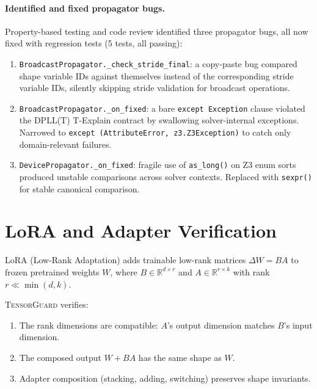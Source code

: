 \documentclass[11pt]{article}
\begin{document}
\paragraph{Identified and fixed propagator bugs.}
Property-based testing and code review identified three propagator bugs,
all now fixed with regression tests (5 tests, all passing):
\begin{enumerate}[leftmargin=2em]
  \item \texttt{BroadcastPropagator.\_check\_stride\_final}: a copy-paste
    bug compared shape variable IDs against themselves instead of
    the corresponding stride variable IDs, silently skipping stride
    validation for broadcast operations.
  \item \texttt{BroadcastPropagator.\_on\_fixed}: a bare
    \texttt{except Exception} clause violated the DPLL(T)
    T-Explain contract by swallowing solver-internal exceptions.
    Narrowed to \texttt{except (AttributeError, z3.Z3Exception)}
    to catch only domain-relevant failures.
  \item \texttt{DevicePropagator.\_on\_fixed}: fragile use of
    \texttt{as\_long()} on Z3 enum sorts produced unstable
    comparisons across solver contexts.  Replaced with
    \texttt{sexpr()} for stable canonical comparison.
\end{enumerate}


\section{LoRA and Adapter Verification}\label{app:lora}

LoRA (Low-Rank Adaptation) adds trainable low-rank matrices
$\Delta W = BA$ to frozen pretrained weights $W$, where
$B \in \mathbb{R}^{d \times r}$ and $A \in \mathbb{R}^{r \times k}$
with rank $r \ll \min(d, k)$.

\textsc{TensorGuard} verifies:
\begin{enumerate}[leftmargin=2em]
  \item The rank dimensions are compatible: $A$'s output dimension
    matches $B$'s input dimension.
  \item The composed output $W + BA$ has the same shape as $W$.
  \item Adapter composition (stacking, adding, switching) preserves
    shape invariants.
\end{enumerate}


\end{document}
